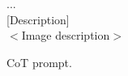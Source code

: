 \begin{figure*}[hbt!]
\begin{center}
\begin{tcolorbox}
            
            
            ... \\
            
            [Description]  \\
            $<$Image description$>$  \\
            
        \end{tcolorbox}
    \end{center}
    \caption{CoT prompt. }
    
    \label{cot_prompt}
\end{figure*}